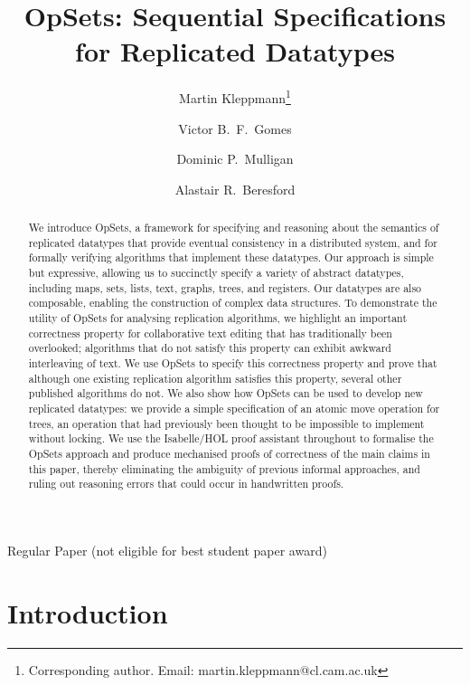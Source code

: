 \documentclass[11pt]{article}
\begin{document}
\sloppy
\title{OpSets: Sequential Specifications for Replicated Datatypes}
\author[1]{Martin Kleppmann\thanks{Corresponding author. Email: martin.kleppmann@cl.cam.ac.uk}}
\author[1]{Victor B.\ F.\ Gomes}
\author[2]{Dominic P.\ Mulligan}
\author[1]{Alastair R.\ Beresford}
\date{}


\maketitle

\begin{center}
Regular Paper (not eligible for best student paper award)
\end{center}

\begin{abstract}
We introduce OpSets, a framework for specifying and reasoning about the semantics of replicated datatypes that provide eventual consistency in a distributed system, and for formally verifying algorithms that implement these datatypes.
Our approach is simple but expressive, allowing us to succinctly specify a variety of abstract datatypes, including maps, sets, lists, text, graphs, trees, and registers.
Our datatypes are also composable, enabling the construction of complex data structures.
To demonstrate the utility of OpSets for analysing replication algorithms, we highlight an important correctness property for collaborative text editing that has traditionally been overlooked; algorithms that do not satisfy this property can exhibit awkward interleaving of text.
We use OpSets to specify this correctness property and prove that although one existing replication algorithm satisfies this property, several other published algorithms do not.
We also show how OpSets can be used to develop new replicated datatypes: we provide a simple specification of an atomic move operation for trees, an operation that had previously been thought to be impossible to implement without locking.
We use the Isabelle/HOL proof assistant throughout to formalise the OpSets approach and produce mechanised proofs of correctness of the main claims in this paper, thereby eliminating the ambiguity of previous informal approaches, and ruling out reasoning errors that could occur in handwritten proofs.
\end{abstract}
\clearpage

\section{Introduction}
\end{document}
